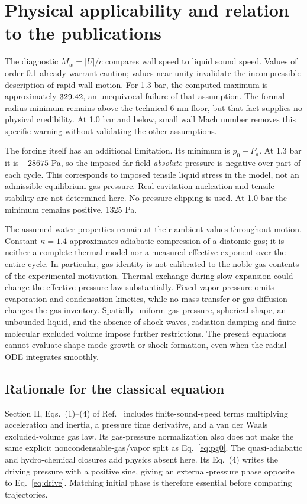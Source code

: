 \documentclass[10pt,a4paper]{article}
\newcommand{\Pa}{P_a}
\newcommand{\Mw}{M_w}
\begin{document}
\newpage
\section{Physical applicability and relation to the publications}
The diagnostic $\Mw=|U|/c$ compares wall speed to liquid sound speed. Values of order 0.1 already warrant caution; values near unity invalidate the incompressible description of rapid wall motion. For 1.3 bar, the computed maximum is approximately $329.42$, an unequivocal failure of that assumption. The formal radius minimum remains above the technical 6 nm floor, but that fact supplies no physical credibility. At 1.0 bar and below, small wall Mach number removes this specific warning without validating the other assumptions.

The forcing itself has an additional limitation. Its minimum is $p_0-\Pa$. At 1.3 bar it is $-28675$ Pa, so the imposed far-field \emph{absolute} pressure is negative over part of each cycle. This corresponds to imposed tensile liquid stress in the model, not an admissible equilibrium gas pressure. Real cavitation nucleation and tensile stability are not determined here. No pressure clipping is used. At 1.0 bar the minimum remains positive, 1325 Pa.

The assumed water properties remain at their ambient values throughout motion. Constant $\kappa=1.4$ approximates adiabatic compression of a diatomic gas; it is neither a complete thermal model nor a measured effective exponent over the entire cycle. In particular, gas identity is not calibrated to the noble-gas contents of the experimental motivation. Thermal exchange during slow expansion could change the effective pressure law substantially. Fixed vapor pressure omits evaporation and condensation kinetics, while no mass transfer or gas diffusion changes the gas inventory. Spatially uniform gas pressure, spherical shape, an unbounded liquid, and the absence of shock waves, radiation damping and finite molecular excluded volume impose further restrictions. The present equations cannot evaluate shape-mode growth or shock formation, even when the radial ODE integrates smoothly.

\subsection{Rationale for the classical equation}
Section II, Eqs.~(1)--(4) of Ref.~\cite{sadighi} includes finite-sound-speed terms multiplying acceleration and inertia, a pressure time derivative, and a van der Waals excluded-volume gas law. Its gas-pressure normalization also does not make the same explicit noncondensable-gas/vapor split as Eq.~\eqref{eq:pg0}. The quasi-adiabatic and hydro-chemical closures add physics absent here. Its Eq.~(4) writes the driving pressure with a positive sine, giving an external-pressure phase opposite to Eq.~\eqref{eq:drive}. Matching initial phase is therefore essential before comparing trajectories.
\end{document}

